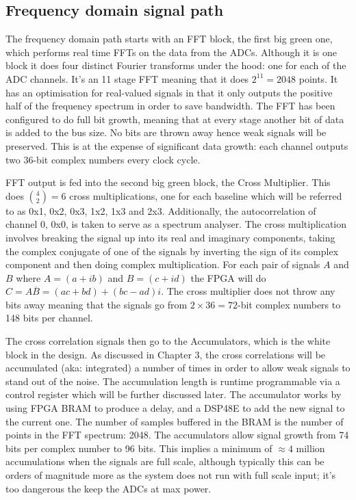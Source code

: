 \subsection{Frequency domain signal path}
The frequency domain path starts with an FFT block, the first big green one,  which performs real time FFTs on the data from the ADCs. Although it is one block it does four distinct Fourier transforms under the hood: one for each of the ADC channels. It's an 11 stage FFT meaning that it does \(2^{11} = 2048\) points. It has an optimisation for real-valued signals in that it only outputs the positive half of the frequency spectrum in order to save bandwidth. The FFT has been configured to do full bit growth, meaning that at every stage another bit of data is added to the bus size. No bits are thrown away hence weak signals will be preserved. This is at the expense of significant data growth: each channel outputs two 36-bit complex numbers every clock cycle.

FFT output is fed into the second big green block, the Cross Multiplier. This does \({4 \choose 2} = 6\) cross multiplications, one for each baseline which will be referred to as 0x1, 0x2, 0x3, 1x2, 1x3 and 2x3. Additionally, the autocorrelation of channel 0, 0x0, is taken to serve as a spectrum analyser. The cross multiplication involves breaking the signal up into its real and imaginary components, taking the complex conjugate of one of the signals by inverting the sign of its complex component and then doing complex multiplication. For each pair of signals \(A\) and \(B\) where \(A = (a + ib)\) and \(B = (c + id)\) the FPGA will do \(C = A\overline{B} = (ac + bd) + (bc - ad)i\). The cross multiplier does not throw any bits away meaning that the signals go from \(2 \times 36 = 72\)-bit complex numbers to 148 bits per channel.

The cross correlation signals then go to the Accumulators, which is the white block in the design. As discussed in Chapter 3, the cross correlations will be accumulated (aka: integrated) a number of times in order to allow weak signals to stand out of the noise. The accumulation length is runtime programmable via a control register which will be further discussed later. The accumulator works by using FPGA BRAM to produce a delay, and a DSP48E to add the new signal to the current one. The number of samples buffered in the BRAM is the number of points in the FFT spectrum: 2048. The accumulators allow signal growth from 74 bits per complex number to 96 bits. This implies a minimum of \(\approx 4\) million accumulations when the signals are full scale, although typically this can be orders of magnitude more as the system does not run with full scale input; it's too dangerous the keep the ADCs at max power.

